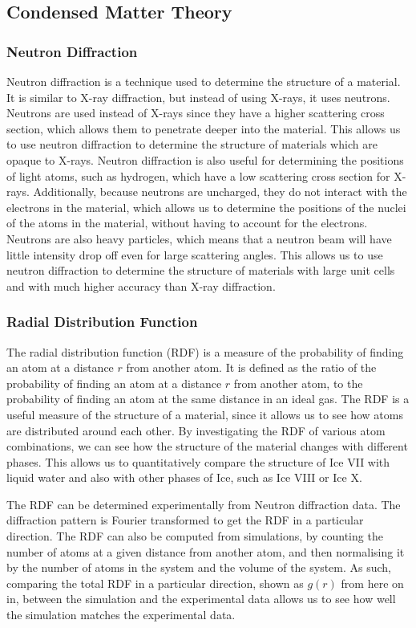 \documentclass[a4paper,11pt]{article}
\begin{document}
\subsection{Condensed Matter Theory}
\subsubsection{Neutron Diffraction}
Neutron diffraction is a technique used to determine the structure of a material. It is similar to X-ray diffraction, but instead of using X-rays, it uses neutrons. Neutrons are used instead of X-rays since they have a higher scattering cross section, which allows them to penetrate deeper into the material. This allows us to use neutron diffraction to determine the structure of materials which are opaque to X-rays. Neutron diffraction is also useful for determining the positions of light atoms, such as hydrogen, which have a low scattering cross section for X-rays. Additionally, because neutrons are uncharged, they do not interact with the electrons in the material, which allows us to determine the positions of the nuclei of the atoms in the material, without having to account for the electrons. Neutrons are also heavy particles, which means that a neutron beam will have little intensity drop off even for large scattering angles. This allows us to use neutron diffraction to determine the structure of materials with large unit cells and with much higher accuracy than X-ray diffraction.
\subsubsection{Radial Distribution Function}
The radial distribution function (RDF) is a measure of the probability of finding an atom at a distance $r$ from another atom. It is defined as the ratio of the probability of finding an atom at a distance $r$ from another atom, to the probability of finding an atom at the same distance in an ideal gas. The RDF is a useful measure of the structure of a material, since it allows us to see how atoms are distributed around each other. By investigating the RDF of various atom combinations, we can see how the structure of the material changes with different phases. This allows us to quantitatively compare the structure of Ice VII with liquid water and also with other phases of Ice, such as Ice VIII or Ice X.

The RDF can be determined experimentally from Neutron diffraction data. The diffraction pattern is Fourier transformed to get the RDF in a particular direction. The RDF can also be computed from simulations, by counting the number of atoms at a given distance from another atom, and then normalising it by the number of atoms in the system and the volume of the system. As such, comparing the total RDF in a particular direction, shown as $g(r)$ from here on in, between the simulation and the experimental data allows us to see how well the simulation matches the experimental data.
\end{document}

